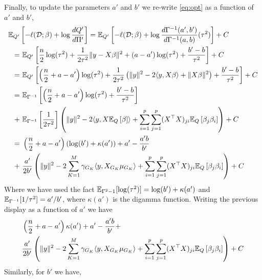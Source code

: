 \documentclass[12pt]{article}
\begin{document}
Finally, to update the parameters $a'$ and $b'$ we re-write \eqref{eq:opt} as a function of $a'$ and $b'$,
\begin{align*}
    \E_{Q'} & \left[ -\ell(\D; \beta) + \log \frac{dQ'}{d\Pi'} \right]
=  
    \E_{Q'} \left[
-
    \ell(\D; \beta)
+   
    \log \frac{d\Gamma^{-1}(a', b')}{d \Gamma^{-1}(a, b)}(\tau^2)\right] 
+
    C \\  
= &\
\E_{Q'} \left[ 
    \frac{n}{2}\log(\tau^2) 
+ 
    \frac{1}{2\tau^2} \| y - X \beta \|^2 
+
    (a - a') \log(\tau^2)
+
    \frac{b' - b}{\tau^2}
\right] + C \\
= &\
\E_{Q'} \left[ 
    \left( \frac{n}{2} + a - a' \right) \log(\tau^2) 
+ 
    \frac{1}{2\tau^2} \left( \| y \|^2
    - 2 \langle y, X \beta \rangle
    + \| X \beta \|^2
    \right)
+
    \frac{b' - b}{\tau^2}
\right] + C \\  
= &\
\E_{\Gamma^{-1}} \left[ 
    \left( \frac{n}{2} + a - a' \right) \log(\tau^2) 
+
    \frac{b' - b}{\tau^2}
\right] \\
+ &\ 
    \E_{\Gamma^{-1}} \left[ \frac{1}{2\tau^2} \right]
    \left( \| y \|^2 
    - 2 \langle y, X \E_Q \left[ \beta \right] \rangle
+  \sum_{i=1}^p \sum_{j=1}^p (X^\top X)_{ji} \E_Q \left[ \beta_j \beta_i \right]
    \right)
+ C \\  
= &\
    \left( \frac{n}{2} + a - a' \right) \left( \log(b') + \kappa(a') \right)
+
    a' - \frac{a'b}{b'}
    \\
+ &\ 
    \frac{a'}{2b'}
    \left( \| y \|^2 
- 
    2 \sum_{K=1}^M \gamma_{G_K} \langle y, X_{G_K} \mu_{G_K} \rangle
+  
    \sum_{i=1}^p \sum_{j=1}^p (X^\top X)_{ji} \E_Q \left[\beta_j \beta_i \right]
    \right) 
+ C
\end{align*}
Where we have used the fact $\mathbb{E}_{\Gamma^2{-1}} [ \log(\tau^2) ] =  \log(b') + \kappa(a') $ and $\mathbb{E}_{\Gamma^{-1}} [ 1 / \tau^2 ] = a' / b' $, where $\kappa(a')$ is the digamma function. Writing the previous display as a function of $a'$ we have
\begin{equation} \label{eq:a_update}
\begin{aligned}
    & \left( \frac{n}{2} + a - a' \right) \kappa(a')
+
    a' - \frac{a'b}{b'}
+  \\
&
    \frac{a'}{2b'}
    \left( \| y \|^2 
- 
    2 \sum_{K=1}^M \gamma_{G_K} \langle y, X_{G_K} \mu_{G_K} \rangle
+  
    \sum_{i=1}^p \sum_{j=1}^p (X^\top X)_{ji} \mathbb{E}_Q \left[\beta_j \beta_i \right]
    \right) 
+ C
\end{aligned}
\end{equation}
Similarly, for $b'$ we have,
\end{document}
